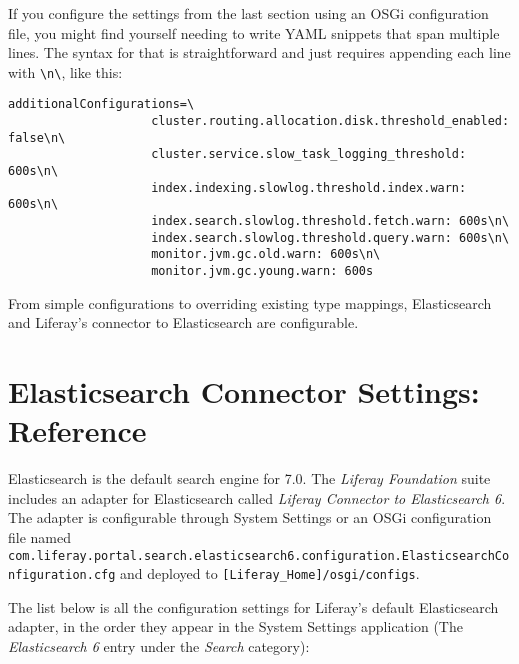 If you configure the settings from the last section using an OSGi
configuration file, you might find yourself needing to write YAML
snippets that span multiple lines. The syntax for that is
straightforward and just requires appending each line with
\texttt{\textbackslash{}n\textbackslash{}}, like this:

\begin{verbatim}
additionalConfigurations=\
                    cluster.routing.allocation.disk.threshold_enabled: false\n\
                    cluster.service.slow_task_logging_threshold: 600s\n\
                    index.indexing.slowlog.threshold.index.warn: 600s\n\
                    index.search.slowlog.threshold.fetch.warn: 600s\n\
                    index.search.slowlog.threshold.query.warn: 600s\n\
                    monitor.jvm.gc.old.warn: 600s\n\
                    monitor.jvm.gc.young.warn: 600s
\end{verbatim}

From simple configurations to overriding existing type mappings,
Elasticsearch and Liferay's connector to Elasticsearch are configurable.

\section{Elasticsearch Connector Settings:
Reference}\label{elasticsearch-connector-settings-reference}

Elasticsearch is the default search engine for 7.0. The \emph{Liferay
Foundation} suite includes an adapter for Elasticsearch called
\emph{Liferay Connector to Elasticsearch 6}. The adapter is configurable
through System Settings or an OSGi configuration file named
\texttt{com.liferay.portal.search.elasticsearch6.configuration.ElasticsearchConfiguration.cfg}
and deployed to \texttt{{[}Liferay\_Home{]}/osgi/configs}.

The list below is all the configuration settings for Liferay's default
Elasticsearch adapter, in the order they appear in the System Settings
application (The \emph{Elasticsearch 6} entry under the \emph{Search}
category):

